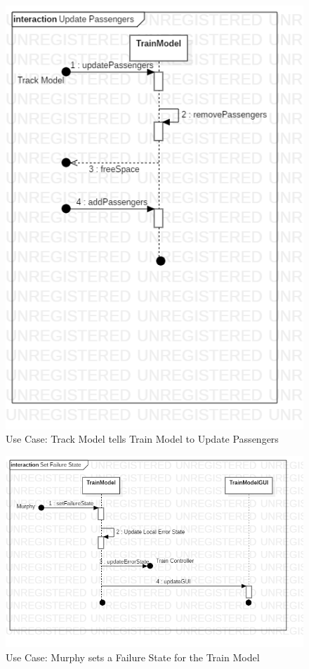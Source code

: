 \documentclass{article}
\begin{document}
    \begin{figure}[H]
        \centering
        \includegraphics[width=\textwidth]{./TrainModel/UpdatePassengers.png}
        \caption{Use Case: Track Model tells Train Model to Update Passengers}
        \label{fig:Train Model Update Passengers}
    \end{figure}
    \begin{figure}[H]
        \centering
        \includegraphics[width=\textwidth]{./TrainModel/SetFailureState.png}
        \caption{Use Case: Murphy sets a Failure State for the Train Model}
        \label{fig:Train Model Failure State}
    \end{figure}
\end{document}
